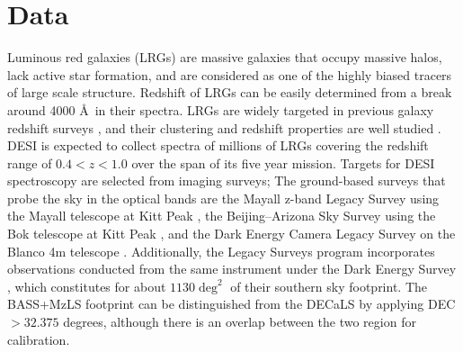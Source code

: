 \section{Data}
\label{sec:data}
Luminous red galaxies (LRGs) are massive galaxies that occupy massive halos, lack active star formation, and are considered as one of the highly biased tracers of large scale structure. Redshift of LRGs can be easily determined from  a break around 4000 \AA~in their spectra. LRGs are widely targeted in previous galaxy redshift surveys \citep[see, e.g.,][]{eisenstein2001spectroscopic, prakash2016sdss}, and their clustering and redshift properties are well studied \citep[see, e.g.,][]{alam2021completed}. DESI is expected to collect spectra of millions of LRGs covering the redshift range of $0.4<z<1.0$ over the span of its five year mission. Targets for DESI spectroscopy are selected from imaging surveys; The ground-based surveys that probe the sky in the optical bands are the Mayall z-band Legacy Survey using the Mayall telescope at Kitt Peak \citep{dey2018overview}, the Beijing–Arizona Sky Survey using the Bok telescope at Kitt Peak \citep{zou2017project}, and the Dark Energy Camera Legacy Survey on the Blanco 4m telescope \citep[DECaLS][]{flaugher2015dark}. Additionally, the Legacy Surveys program incorporates observations conducted from the same instrument under the Dark Energy Survey \citep{abbott2016dark}, which constitutes for about $1130 \deg^{2}$ of their southern sky footprint. The BASS+MzLS footprint can be distinguished from the DECaLS by applying DEC $> 32.375$ degrees, although there is an overlap between the two region for calibration. 

